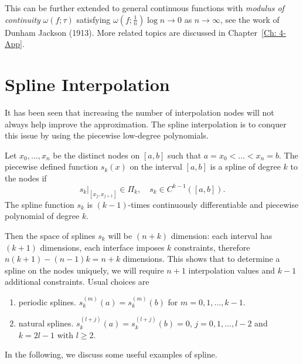 \begin{remark}
    This can be further extended to general continuous functions with \emph{modulus of continuity} $\omega(f;\tau)$ satisfying $\omega(f;\frac{1}{n})\log n \to 0$ as $n\to\infty$, see the work of Dunham Jackson (1913). More related topics are discussed in Chapter~\ref{Ch: 4-App}.
\end{remark}

\section{Spline Interpolation}
\label{Sec: 2-Spl-Int}
It has been seen that increasing the number of interpolation nodes will not always help improve the approximation. The spline interpolation is to conquer this issue by using the piecewise low-degree polynomials. 

\begin{definition}
    Let $x_0, \dots, x_n$ be the distinct nodes on $[a, b]$ such that $a = x_0 <\dots < x_n = b$. The piecewise defined function $s_k(x)$ on the interval $[a, b]$ is a spline of degree $k$ to the nodes if  
    \begin{equation}
        s_k|_{[x_j, x_{j+1}]} \in \Pi_k, \quad s_k\in C^{k-1}([a, b]).
    \end{equation}
    The spline function $s_k$ is $(k-1)$-times continuously differentiable and piecewise polynomial of degree $k$.
\end{definition}
Then the space of splines $s_k$ will be $(n + k)$ dimension: each interval has $(k+1)$ dimensions, each interface imposes $k$ constraints, therefore $n (k+ 1) - (n-1) k = n + k$ dimensions. This shows that to determine a spline on the nodes uniquely, we will require $n+1$ interpolation values and $k-1$ additional constraints. Usual choices are
\begin{enumerate}
    \item periodic splines. $s_k^{(m)}(a) = s_k^{(m)}(b)$ for $m = 0, 1, \dots, k-1$.
    \item natural splines. $s_k^{(l+j)}(a) = s_k^{(l+j)}(b) = 0$, $j = 0, 1,\dots, l-2$ and $k = 2l-1$ with $l\ge 2$.
\end{enumerate}
In the following, we discuss some useful examples of spline. 
